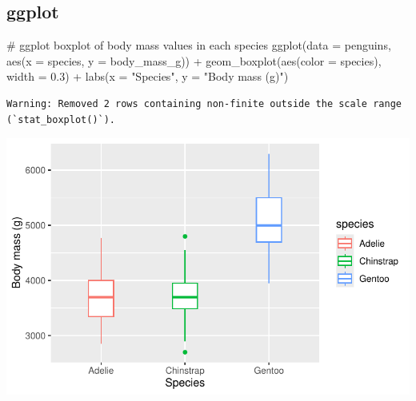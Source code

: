 \documentclass[
  letterpaper,
  DIV=11,
  numbers=noendperiod]{scrreprt}
\newenvironment{Shaded}{\begin{snugshade}}{\end{snugshade}}
\newcommand{\AttributeTok}[1]{\textcolor[rgb]{0.40,0.45,0.13}{#1}}
\newcommand{\CommentTok}[1]{\textcolor[rgb]{0.37,0.37,0.37}{#1}}
\newcommand{\FloatTok}[1]{\textcolor[rgb]{0.68,0.00,0.00}{#1}}
\newcommand{\FunctionTok}[1]{\textcolor[rgb]{0.28,0.35,0.67}{#1}}
\newcommand{\NormalTok}[1]{\textcolor[rgb]{0.00,0.23,0.31}{#1}}
\newcommand{\SpecialCharTok}[1]{\textcolor[rgb]{0.37,0.37,0.37}{#1}}
\newcommand{\StringTok}[1]{\textcolor[rgb]{0.13,0.47,0.30}{#1}}
\begin{document}
\begin{tcolorbox}[enhanced jigsaw, bottomtitle=1mm, bottomrule=.15mm, toprule=.15mm, opacityback=0, leftrule=.75mm, breakable, colback=white, toptitle=1mm, left=2mm, coltitle=black, titlerule=0mm, opacitybacktitle=0.6, title=\textcolor{quarto-callout-tip-color}{\faLightbulb}\hspace{0.5em}{Hint -- a reminder of the basic syntax for boxplots}, rightrule=.15mm, arc=.35mm, colframe=quarto-callout-tip-color-frame, colbacktitle=quarto-callout-tip-color!10!white]

\section{ggplot}

\begin{Shaded}
\begin{Highlighting}[]
\CommentTok{\# ggplot boxplot of body mass values in each species}
\FunctionTok{ggplot}\NormalTok{(}\AttributeTok{data =}\NormalTok{ penguins, }\FunctionTok{aes}\NormalTok{(}\AttributeTok{x =}\NormalTok{ species, }\AttributeTok{y =}\NormalTok{ body\_mass\_g)) }\SpecialCharTok{+}
  \FunctionTok{geom\_boxplot}\NormalTok{(}\FunctionTok{aes}\NormalTok{(}\AttributeTok{color =}\NormalTok{ species), }\AttributeTok{width =} \FloatTok{0.3}\NormalTok{) }\SpecialCharTok{+}
  \FunctionTok{labs}\NormalTok{(}\AttributeTok{x =} \StringTok{"Species"}\NormalTok{,}
       \AttributeTok{y =} \StringTok{"Body mass (g)"}\NormalTok{)}
\end{Highlighting}
\end{Shaded}

\begin{verbatim}
Warning: Removed 2 rows containing non-finite outside the scale range
(`stat_boxplot()`).
\end{verbatim}

\includegraphics{scripts/02_dataViz/class4_files/figure-pdf/boxplot_ggplot-1.pdf}


\end{tcolorbox}
\end{document}
